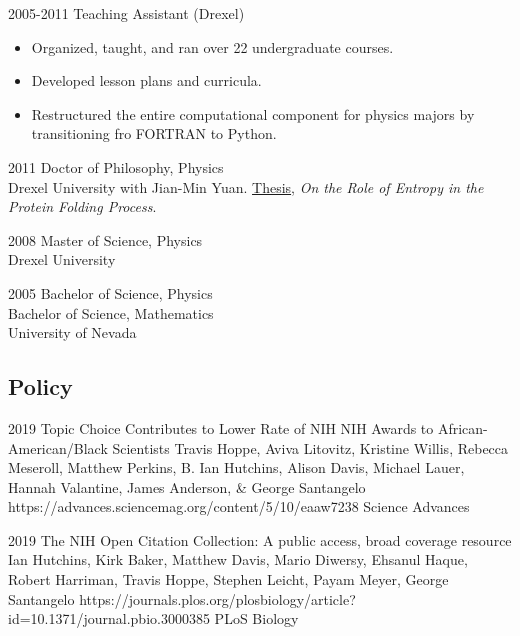 \documentclass[]{scrartcl}
\begin{document}
\begin{cleanCV}
\WorkExperience
{2005-2011}
{Teaching Assistant (Drexel)}
{
  \begin{itemize}
  \item   Organized, taught, and ran over 22 undergraduate courses.
  \item   Developed lesson plans and curricula.
  \item   Restructured the entire computational component for physics majors by transitioning fro FORTRAN to Python.
  \end{itemize}
}


\newpage


\WorkExperience
{2011}
{Doctor of Philosophy, Physics}
{
\\Drexel University with Jian-Min Yuan. 
\href{https://idea.library.drexel.edu/islandora/object/idea:3488}{Thesis},
\emph{On the Role of Entropy in the Protein Folding Process}.
}

\WorkExperience
{2008}
{Master of Science, Physics}
{\\Drexel University}

\WorkExperience
{2005}
{Bachelor of Science, Physics\\
Bachelor of Science, Mathematics}
{\\University of Nevada}




\subsection{Policy}

\Paper
{2019}
{Topic Choice Contributes to Lower Rate of NIH NIH Awards to African-American/Black Scientists}
{Travis Hoppe, Aviva Litovitz, Kristine Willis, Rebecca Meseroll, Matthew Perkins, B. Ian Hutchins, Alison Davis, Michael Lauer, Hannah Valantine, James Anderson, \& George Santangelo}
{https://advances.sciencemag.org/content/5/10/eaaw7238}
{Science Advances}

\Paper
{2019}
{The NIH Open Citation Collection: A public access, broad coverage resource}
{Ian Hutchins, Kirk Baker, Matthew Davis, Mario Diwersy, Ehsanul Haque, Robert Harriman, Travis Hoppe, Stephen Leicht, Payam Meyer, George Santangelo}
{https://journals.plos.org/plosbiology/article?id=10.1371/journal.pbio.3000385}
{PLoS Biology}



\end{cleanCV}
\end{document}
